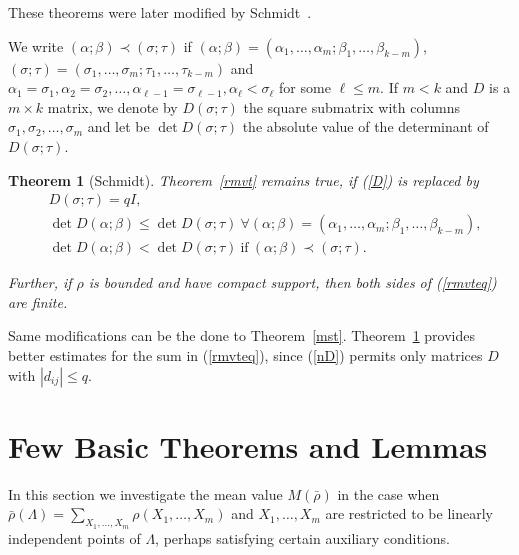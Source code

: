 \documentclass[11pt]{article}
\newtheorem{theorem}{Theorem}[section]
\theoremstyle{definition}
\theoremstyle{proof}
\begin{document}
These theorems were later modified by Schmidt~\cite{schmidt58}.

We write $(\alpha; \beta ) \prec (\sigma ; \tau )$ if $(\alpha ; \beta ) = ( \alpha _1, \ldots, \alpha _m; \beta _1, \ldots, \beta _{k-m})$, $(\sigma ; \tau ) = (\sigma _1, \ldots, \sigma _m; \tau _1, \ldots, \tau _{k-m})$ and $\alpha _1 = \sigma _1, \alpha _2 = \sigma _2, \ldots , \alpha _{\ell - 1} = \sigma _{\ell - 1}, \alpha _\ell < \sigma _\ell  $ for some $\ell \leq m$.
If $m<k$ and $D$ is a $m \times k$ matrix, we denote by $D(\sigma ; \tau )$ the square submatrix with columns $\sigma _1, \sigma _2, \ldots , \sigma _m$ and let be $\det D(\sigma ; \tau )$ the absolute value of the determinant of $D(\sigma; \tau )$.

\begin{theorem}[Schmidt]\label{schmvt}
    Theorem~\ref{rmvt} remains true, if (\ref{D}) is replaced by
    \begin{equation}\label{nD}
        \begin{split}
            & D(\sigma ; \tau ) = qI, \\
            & \det D(\alpha ; \beta ) \leq  \det D (\sigma ; \tau ) \ \forall (\alpha ; \beta ) = (\alpha _1, \ldots, \alpha _m ; \beta _1, \ldots, \beta _{k-m}), \\
            & \det D(\alpha; \beta ) < \det D(\sigma; \tau ) \ \text{if} \ (\alpha; \beta ) \prec (\sigma ; \tau ).
        \end{split}
    \end{equation}

    Further, if $\rho$ is bounded and have compact support, then both sides of (\ref{rmvteq}) are finite.
\end{theorem}

Same modifications can be the done to Theorem~\ref{mst}.
Theorem~\ref{schmvt} provides better estimates for the sum in (\ref{rmvteq}), since (\ref{nD}) permits only matrices $D$ with $|d_{ij}| \leq q$.

\section{Few Basic Theorems and Lemmas}
In this section we investigate the mean value $M(\bar{\rho })$ in the case when $\bar{\rho} (\Lambda ) = \displaystyle\sum_{X_1, \ldots, X_m} \rho (X_1, \ldots, X_m)$ and $X_1, \ldots, X_m$ are restricted to be linearly independent points of $\Lambda$, perhaps satisfying certain auxiliary conditions.
\end{document}
